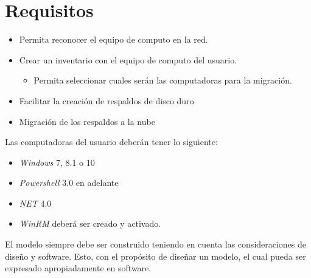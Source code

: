 \documentclass[12pt,twoside]{reedthesis}
\providecommand{\tightlist}{%
  \setlength{\itemsep}{0pt}\setlength{\parskip}{0pt}}
\begin{document}
\hypertarget{requisitos}{%
\section{Requisitos}\label{requisitos}}
\begin{itemize}
\tightlist
\item
  Permita reconocer el equipo de computo en la red.
\item
  Crear un inventario con el equipo de computo del usuario.
  \begin{itemize}
  \tightlist
  \item
    Permita seleccionar cuales serán las computadoras para la migración.
  \end{itemize}
\item
  Facilitar la creación de respaldos de disco duro
\item
  Migración de los respaldos a la nube
\end{itemize}
Las computadoras del usuario deberán tener lo siguiente:
\begin{itemize}
\tightlist
\item
  \emph{Windows} 7, 8.1 o 10
\item
  \emph{Powershell} 3.0 en adelante
\item
  \emph{NET} 4.0
\item
  \emph{WinRM} deberá ser creado y activado.
\end{itemize}
El modelo siempre debe ser construido teniendo en cuenta las consideraciones de diseño y software. Esto, con el propósito de diseñar un modelo, el cual pueda ser expresado apropiadamente en software.
\end{document}
